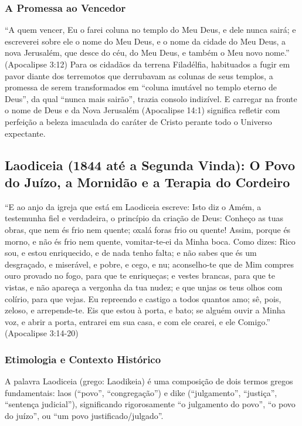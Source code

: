 \documentclass[11pt,a4paper,openany]{book}
\begin{document}
\subsubsection*{A Promessa ao Vencedor}
``A quem vencer, Eu o farei coluna no templo do Meu Deus, e dele nunca sairá; e escreverei sobre ele o nome do Meu Deus, e o nome da cidade do Meu Deus, a nova Jerusalém, que desce do céu, do Meu Deus, e também o Meu novo nome.'' (Apocalipse 3:12)
Para os cidadãos da terrena Filadélfia, habituados a fugir em pavor diante dos terremotos que derrubavam as colunas de seus templos, a promessa de serem transformados em ``coluna imutável no templo eterno de Deus'', da qual ``nunca mais sairão'', trazia consolo indizível. E carregar na fronte o nome de Deus e da Nova Jerusalém (Apocalipse 14:1) significa refletir com perfeição a beleza imaculada do caráter de Cristo perante todo o Universo expectante.



\subsection{Laodiceia (1844 até a Segunda Vinda): O Povo do Juízo, a Mornidão e a Terapia do Cordeiro}


``E ao anjo da igreja que está em Laodiceia escreve: Isto diz o Amém, a testemunha fiel e verdadeira, o princípio da criação de Deus: Conheço as tuas obras, que nem és frio nem quente; oxalá foras frio ou quente! Assim, porque és morno, e não és frio nem quente, vomitar-te-ei da Minha boca. Como dizes: Rico sou, e estou enriquecido, e de nada tenho falta; e não sabes que és um desgraçado, e miserável, e pobre, e cego, e nu; aconselho-te que de Mim compres ouro provado no fogo, para que te enriqueças; e vestes brancas, para que te vistas, e não apareça a vergonha da tua nudez; e que unjas os teus olhos com colírio, para que vejas. Eu repreendo e castigo a todos quantos amo; sê, pois, zeloso, e arrepende-te. Eis que estou à porta, e bato; se alguém ouvir a Minha voz, e abrir a porta, entrarei em sua casa, e com ele cearei, e ele Comigo.'' (Apocalipse 3:14-20)


\subsubsection*{Etimologia e Contexto Histórico}
A palavra Laodiceia (grego: Laodikeia) é uma composição de dois termos gregos fundamentais: laos (``povo'', ``congregação'') e dike (``julgamento'', ``justiça'', ``sentença judicial''), significando rigorosamente ``o julgamento do povo'', ``o povo do juízo'', ou ``um povo justificado/julgado''.
\end{document}
